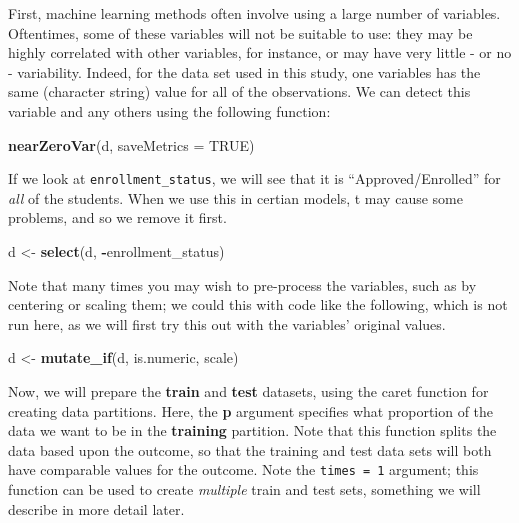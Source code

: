 \documentclass[]{book}
\newenvironment{Shaded}{\begin{snugshade}}{\end{snugshade}}
\newcommand{\KeywordTok}[1]{\textcolor[rgb]{0.13,0.29,0.53}{\textbf{#1}}}
\newcommand{\DataTypeTok}[1]{\textcolor[rgb]{0.13,0.29,0.53}{#1}}
\newcommand{\StringTok}[1]{\textcolor[rgb]{0.31,0.60,0.02}{#1}}
\newcommand{\OtherTok}[1]{\textcolor[rgb]{0.56,0.35,0.01}{#1}}
\newcommand{\OperatorTok}[1]{\textcolor[rgb]{0.81,0.36,0.00}{\textbf{#1}}}
\newcommand{\NormalTok}[1]{#1}
\begin{document}
First, machine learning methods often involve using a large number of
variables. Oftentimes, some of these variables will not be suitable to
use: they may be highly correlated with other variables, for instance,
or may have very little - or no - variability. Indeed, for the data set
used in this study, one variables has the same (character string) value
for all of the observations. We can detect this variable and any others
using the following function:

\begin{Shaded}
\begin{Highlighting}[]
\KeywordTok{nearZeroVar}\NormalTok{(d, }\DataTypeTok{saveMetrics =} \OtherTok{TRUE}\NormalTok{)}
\end{Highlighting}
\end{Shaded}

If we look at \texttt{enrollment\_status}, we will see that it is
``Approved/Enrolled'' for \emph{all} of the students. When we use this
in certian models, t may cause some problems, and so we remove it first.

\begin{Shaded}
\begin{Highlighting}[]
\NormalTok{d <-}\StringTok{ }\KeywordTok{select}\NormalTok{(d, }\OperatorTok{-}\NormalTok{enrollment_status)}
\end{Highlighting}
\end{Shaded}

Note that many times you may wish to pre-process the variables, such as
by centering or scaling them; we could this with code like the
following, which is not run here, as we will first try this out with the
variables' original values.

\begin{Shaded}
\begin{Highlighting}[]
\NormalTok{d <-}\StringTok{ }\KeywordTok{mutate_if}\NormalTok{(d, }
\NormalTok{               is.numeric, scale)}
\end{Highlighting}
\end{Shaded}

Now, we will prepare the \textbf{train} and \textbf{test} datasets,
using the caret function for creating data partitions. Here, the
\textbf{p} argument specifies what proportion of the data we want to be
in the \textbf{training} partition. Note that this function splits the
data based upon the outcome, so that the training and test data sets
will both have comparable values for the outcome. Note the
\texttt{times\ =\ 1} argument; this function can be used to create
\emph{multiple} train and test sets, something we will describe in more
detail later.
\end{document}
